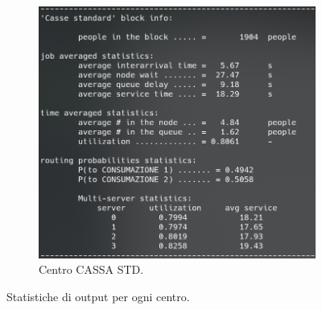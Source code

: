 \documentclass{article}
\begin{document}
\begin{figure}[H]
\begin{subfigure}{.5\textwidth}
  \includegraphics[width=.9\linewidth]{img/migliorativo_2_2/standard.png}
  \caption{Centro CASSA STD.}
  \label{fig:cassa_std_ext_2_pol_2}
\end{subfigure}
\caption{Statistiche di output per ogni centro.}
\label{fig:output_ext_2_pol_2}
\end{figure}
\end{document}
